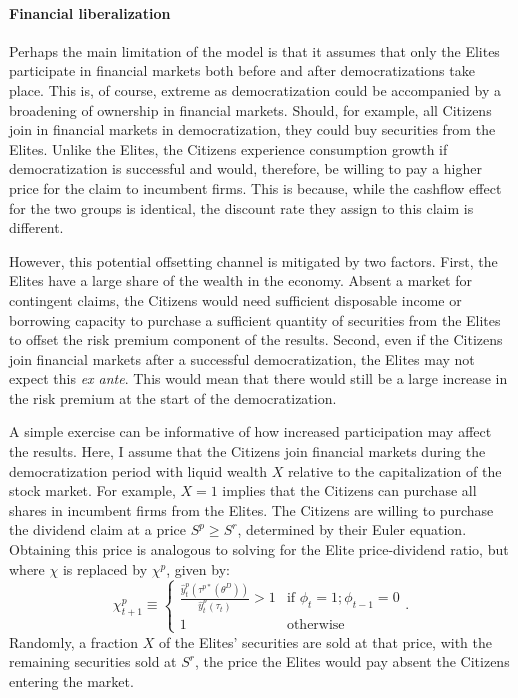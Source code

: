 \paragraph{Financial liberalization}
\label{par:finanace_lib_beg}
Perhaps the main limitation of the model is that it assumes that only the Elites participate in financial markets both before and after democratizations take place. This is, of course, extreme as democratization could be accompanied by a broadening of ownership in financial markets. Should, for example, all Citizens join in financial markets in democratization, they could buy securities from the Elites. Unlike the Elites, the Citizens experience consumption growth if democratization is successful and would, therefore, be willing to pay a higher price for the claim to incumbent firms. This is because, while the cashflow effect for the two groups is identical, the discount rate they assign to this claim is different.

However, this potential offsetting channel is mitigated by two factors. First, the Elites have a large share of the wealth in the economy. Absent a market for contingent claims, the Citizens would need sufficient disposable income or borrowing capacity to purchase a sufficient quantity of securities from the Elites to offset the risk premium component of the results. Second, even if the Citizens join financial markets after a successful democratization, the Elites may not expect this \textit{ex ante}. This would mean that there would still be a large increase in the risk premium at the start of the democratization.

A simple exercise can be informative of how increased participation may affect the results. Here, I assume that the Citizens join financial markets during the democratization period with liquid wealth $X$ relative to the capitalization of the stock market. For example, $X=1$ implies that the Citizens can purchase all shares in incumbent firms from the Elites. The Citizens are willing to purchase the dividend claim at a price $S^p \geq S^r$, determined by their Euler equation. Obtaining this price is analogous to solving for the Elite price-dividend ratio, but where $\chi$ is replaced by $\chi^p$, given by:
\begin{equation}\label{eq:citizen_disaster}
\chi^p_{t+1} \equiv \begin{cases} 
\frac{\hat{y}_{t}^{p}(\tau^{p*}(\theta^{D}))}{\hat{y}_{t}^{p}(\tau_{t})} > 1 & \textrm{if }\phi_{t}=1;\phi_{t-1}=0 \\
1 & \textrm{otherwise}
\end{cases}.
\end{equation}
Randomly, a fraction $X$ of the Elites' securities are sold at that price, with the remaining securities sold at $S^r$, the price the Elites would pay absent the Citizens entering the market.

